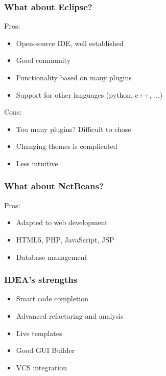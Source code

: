 \begin{frame}
  \frametitle{What about Eclipse?}
  Pros:
  \begin{itemize}
    \item Open-source IDE, well established
    \item Good community
    \item Functionality based on many plugins
    \item Support for other languages (python, c++, ...)
  \end{itemize}
  Cons:
  \begin{itemize}
    \item Too many plugins? Difficult to chose
    \item Changing themes is complicated
    \item Less intuitive
  \end{itemize}
\end{frame}

\begin{frame}
  \frametitle{What about NetBeans?}
  Pros:
  \begin{itemize}
    \item Adapted to web development
    \item HTML5, PHP, JavaScript, JSP
    \item Database management
  \end{itemize}
\end{frame}


\begin{frame}
  \frametitle{IDEA's strengths}
  \begin{itemize}
    \item Smart code completion
    \item Advanced refactoring and analysis
    \item Live templates
    \item Good GUI Builder
    \item VCS integration
  \end{itemize}
\end{frame}
